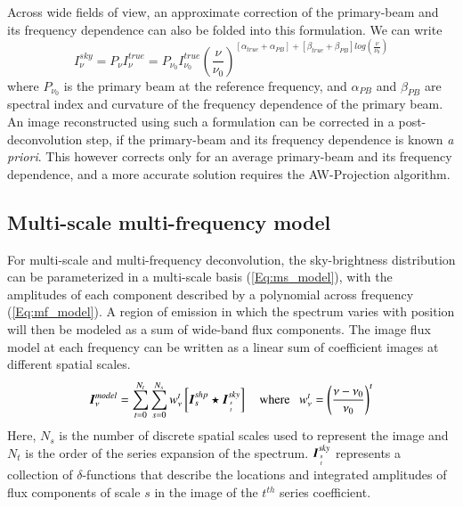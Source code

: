 \documentclass[structabstract]{stylefiles/aa}
\newcommand{\nuno}{{\left(\frac{\nu}{\nu_0}\right)}}
\newcommand{\dnuno}{{\left(\frac{\nu-\nu_0}{\nu_0}\right)}}
\newcommand{\wnt}{{w_{\nu}^t}}
\begin{document}
Across wide fields of view, an approximate correction of the primary-beam and its
frequency dependence can also be folded into this formulation. 
We can write 
\begin{equation}
I_{\nu}^{sky} = P_{\nu}  I_{\nu}^{true} =  P_{\nu_0} I_{\nu_0}^{true} \nuno^{[\alpha_{true}+\alpha_{PB}] + [\beta_{true} + \beta_{PB} ] log \nuno}
\label{EQN_POWERLAW2}
\end{equation}
where $P_{\nu_0}$ is the primary beam at the reference frequency, and
$\alpha_{PB}$ and $\beta_{PB}$ are spectral index and curvature of the frequency
dependence of the primary beam.   An image reconstructed using such a 
formulation can be corrected in a post-deconvolution step, if the primary-beam and
its frequency dependence is known {\it a priori}.  This however corrects only for
an average primary-beam and its frequency dependence, and a more accurate
solution requires the AW-Projection algorithm. 

\subsection{Multi-scale multi-frequency model}
For multi-scale and multi-frequency deconvolution, the sky-brightness distribution
can be parameterized in a multi-scale basis (\ref{Eq:ms_model}), with the amplitudes
of each component described by a polynomial across frequency (\ref{Eq:mf_model}).  
A region of emission in which the spectrum varies with position
will then be modeled as a sum of wide-band flux components.
The image flux model at each frequency can be written as a linear sum of  
coefficient images at different spatial scales. 
\begin{equation}
\vec{I}^{model}_{\nu} = \sum_{t=0}^{N_t} \sum_{s=0}^{N_s} \wnt \left[ \vec{I}^{shp}_s \star \vec{I}^{sky}_{s\atop t}\right] ~~~~\mathrm{where}~~~\wnt = \dnuno^t 
\label{Eq:msmf_model}
\end{equation}
Here, $N_s$ is the number of discrete spatial scales used to represent the image and  
$N_t$ is the order of the series expansion of the spectrum. 
$\vec{I}^{sky}_{s\atop t}$ represents a collection of $\delta$-functions that describe the locations
and integrated amplitudes of flux components of scale $s$ in the image of the $t^{th}$ series 
coefficient. 
\end{document}
